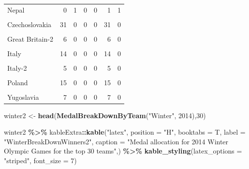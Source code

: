 \documentclass[
]{article}
\newenvironment{Shaded}{\begin{snugshade}}{\end{snugshade}}
\newcommand{\AttributeTok}[1]{\textcolor[rgb]{0.13,0.29,0.53}{#1}}
\newcommand{\DecValTok}[1]{\textcolor[rgb]{0.00,0.00,0.81}{#1}}
\newcommand{\FunctionTok}[1]{\textcolor[rgb]{0.13,0.29,0.53}{\textbf{#1}}}
\newcommand{\NormalTok}[1]{#1}
\newcommand{\OtherTok}[1]{\textcolor[rgb]{0.56,0.35,0.01}{#1}}
\newcommand{\SpecialCharTok}[1]{\textcolor[rgb]{0.81,0.36,0.00}{\textbf{#1}}}
\newcommand{\StringTok}[1]{\textcolor[rgb]{0.31,0.60,0.02}{#1}}
\begin{document}
\begin{table}[H]
\begin{tabular}[t]{lrrrrrr}
\addlinespace
Nepal & 0 & 1 & 0 & 0 & 1 & 1\\
\cellcolor{gray!10}{Belgium} & \cellcolor{gray!10}{27} & \cellcolor{gray!10}{0} & \cellcolor{gray!10}{0} & \cellcolor{gray!10}{0} & \cellcolor{gray!10}{27} & \cellcolor{gray!10}{0}\\
Czechoslovakia & 31 & 0 & 0 & 0 & 31 & 0\\
\cellcolor{gray!10}{France-2} & \cellcolor{gray!10}{6} & \cellcolor{gray!10}{0} & \cellcolor{gray!10}{0} & \cellcolor{gray!10}{0} & \cellcolor{gray!10}{6} & \cellcolor{gray!10}{0}\\
Great Britain-2 & 6 & 0 & 0 & 0 & 6 & 0\\
\addlinespace
\cellcolor{gray!10}{Hungary} & \cellcolor{gray!10}{6} & \cellcolor{gray!10}{0} & \cellcolor{gray!10}{0} & \cellcolor{gray!10}{0} & \cellcolor{gray!10}{6} & \cellcolor{gray!10}{0}\\
Italy & 14 & 0 & 0 & 0 & 14 & 0\\
\cellcolor{gray!10}{Italy-1} & \cellcolor{gray!10}{5} & \cellcolor{gray!10}{0} & \cellcolor{gray!10}{0} & \cellcolor{gray!10}{0} & \cellcolor{gray!10}{5} & \cellcolor{gray!10}{0}\\
Italy-2 & 5 & 0 & 0 & 0 & 5 & 0\\
\cellcolor{gray!10}{Latvia} & \cellcolor{gray!10}{7} & \cellcolor{gray!10}{0} & \cellcolor{gray!10}{0} & \cellcolor{gray!10}{0} & \cellcolor{gray!10}{7} & \cellcolor{gray!10}{0}\\
\addlinespace
Poland & 15 & 0 & 0 & 0 & 15 & 0\\
\cellcolor{gray!10}{Switzerland-2} & \cellcolor{gray!10}{4} & \cellcolor{gray!10}{0} & \cellcolor{gray!10}{0} & \cellcolor{gray!10}{0} & \cellcolor{gray!10}{4} & \cellcolor{gray!10}{0}\\
Yugoslavia & 7 & 0 & 0 & 0 & 7 & 0\\
\bottomrule
\end{tabular}
\end{table}

\begin{Shaded}
\begin{Highlighting}[]
\NormalTok{winter2 }\OtherTok{\textless{}{-}} \FunctionTok{head}\NormalTok{(}\FunctionTok{MedalBreakDownByTeam}\NormalTok{(}\StringTok{"Winter"}\NormalTok{, }\DecValTok{2014}\NormalTok{),}\DecValTok{30}\NormalTok{)}

\NormalTok{winter2 }\SpecialCharTok{\%\textgreater{}\%} 
\NormalTok{  kableExtra}\SpecialCharTok{::}\FunctionTok{kable}\NormalTok{(}\StringTok{"latex"}\NormalTok{, }\AttributeTok{position =} \StringTok{"H"}\NormalTok{,  }\AttributeTok{booktabs =}\NormalTok{ T,}
         \AttributeTok{label =} \StringTok{"WinterBreakDownWinners2"}\NormalTok{,}
         \AttributeTok{caption =} \StringTok{"Medal allocation for 2014 Winter Olympic Games for the top 30 teams"}\NormalTok{,) }\SpecialCharTok{\%\textgreater{}\%} 
         \FunctionTok{kable\_styling}\NormalTok{(}\AttributeTok{latex\_options =} \StringTok{"striped"}\NormalTok{, }\AttributeTok{font\_size =} \DecValTok{7}\NormalTok{)}
\end{Highlighting}
\end{Shaded}
\end{document}
